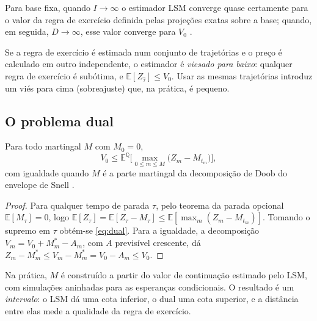 \begin{teorema}[Convergência]
Para base fixa, quando $I\to\infty$ o estimador LSM converge quase certamente para o valor da regra de exercício definida pelas projeções exatas sobre a base; quando, em seguida, $D\to\infty$, esse valor converge para $V_0$ \citep{clementetal2002}.
\end{teorema}

\begin{observacao}
Se a regra de exercício é estimada num conjunto de trajetórias e o preço é calculado em outro independente, o estimador é \emph{viesado para baixo}: qualquer regra de exercício é subótima, e $\mathbb E[Z_{\hat\tau}]\le V_0$. Usar as mesmas trajetórias introduz um viés para cima (sobreajuste) que, na prática, é pequeno.
\end{observacao}

\subsection{O problema dual}

\begin{teorema}\label{teo:dual}
Para todo martingal $M$ com $M_0=0$,
\begin{equation}\label{eq:dual}
V_0\le\mathbb E^{\mathbb Q}\Big[\max_{0\le m\le M}\big(Z_m-M_{t_m}\big)\Big],
\end{equation}
com igualdade quando $M$ é a parte martingal da decomposição de Doob do envelope de Snell \citep{rogers2002,haughkogan2004}.
\end{teorema}

\begin{proof}
Para qualquer tempo de parada $\tau$, pelo teorema da parada opcional $\mathbb E[M_\tau]=0$, logo $\mathbb E[Z_\tau]=\mathbb E[Z_\tau-M_\tau]\le\mathbb E[\max_m(Z_m-M_{t_m})]$. Tomando o supremo em $\tau$ obtém-se \eqref{eq:dual}. Para a igualdade, a decomposição $V_m=V_0+M^*_m-A_m$, com $A$ previsível crescente, dá $Z_m-M^*_m\le V_m-M^*_m=V_0-A_m\le V_0$.
\end{proof}

Na prática, $M$ é construído a partir do valor de continuação estimado pelo LSM, com simulações aninhadas para as esperanças condicionais. O resultado é um \emph{intervalo}: o LSM dá uma cota inferior, o dual uma cota superior, e a distância entre elas mede a qualidade da regra de exercício.

